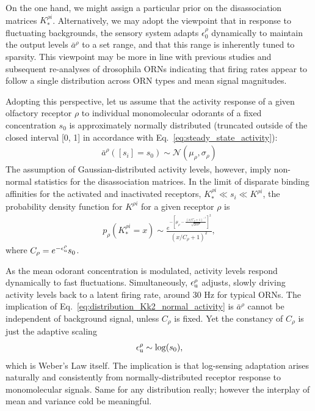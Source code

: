 \documentclass[9pt,twocolumn,twoside]{pnas-new}
\begin{document}
On the one hand, we might assign a particular prior on the disassociation matrices $K_*^{\rho i}$. Alternatively, we may adopt the viewpoint that in response to fluctuating backgrounds, the sensory system adapts $\epsilon^\rho_0$ dynamically to maintain the output levels $\bar a^\rho$ to a set range, and that this range is inherently tuned to sparsity. This viewpoint may be more in line with previous studies and subsequent re-analyses of drosophila ORNs indicating that firing rates appear to follow a single distribution across ORN types and mean signal magnitudes. 

Adopting this perspective, let us assume that the activity response of a given olfactory receptor $\rho$ to individual monomolecular odorants of a fixed concentration $s_0$ is approximately normally distributed (truncated outside of the closed interval [0, 1] in accordance with Eq.~\ref{eq:steady_state_activity}):
\begin{align}
\bar a^\rho([s_i] = s_0) \sim \mathcal N(\mu_\rho, \sigma_\rho)
\label{eq:monomolecular_activity_levels}
\end{align} 
The assumption of Gaussian-distributed activity levels, however, imply non-normal statistics for the disassociation matrices. In the limit of disparate binding affinities for the activated and inactivated receptors, $K^{\rho i}_* \ll s_i \ll K^{\rho i}$, the probability density function for $K^{\rho i}$ for a given receptor $\rho$ is
\begin{align}
p_\rho(K_*^{\rho i} = x)  \sim \frac{e^{-\left[\mu_\rho - \frac{(x/C_\rho + 1)^{-1}}{\sqrt{2\pi \sigma^2}}\right]^2}}{(x/C_\rho + 1)^2}, 
\label{eq:distribution_Kk2_normal_activity}
\end{align}
where $C_\rho = e^{-\epsilon_{\text u}^\rho}s_0$. 

As the mean odorant concentration is modulated, activity levels respond dynamically to fast fluctuations. Simultaneously, $\epsilon_{\text u}^\rho$ adjusts, slowly driving activity levels back to a latent firing rate, around 30 Hz for typical ORNs. The implication of Eq.~\ref{eq:distribution_Kk2_normal_activity} is $\bar a^\rho$ cannot be independent of background signal, unless $C_\rho$ is fixed. Yet the constancy of $C_\rho$ is just the adaptive scaling
\begin{align}
\epsilon_{\text u}^\rho \sim \log(s_0),
\end{align}
which is Weber's Law itself. The implication is that log-sensing adaptation arises naturally and consistently from normally-distributed receptor response to monomolecular signals. {\color {blue} Same for any distribution really; however the interplay of mean and variance cold be meaningful.}
\end{document}

